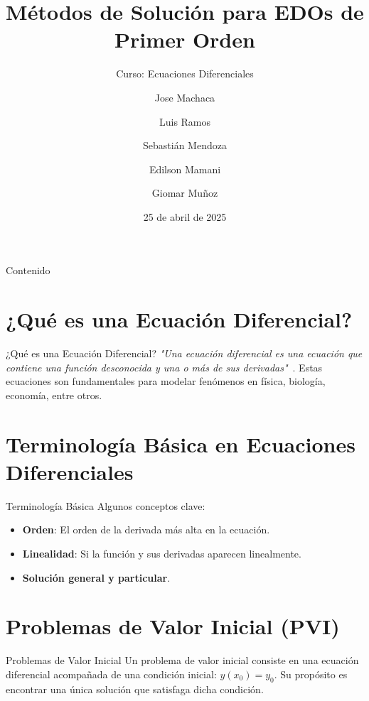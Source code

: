 \documentclass{beamer}
\title[Métodos EDO 1\textsuperscript{er} orden]{Métodos de Solución para EDOs de Primer Orden}
\subtitle{Curso: Ecuaciones Diferenciales}
\author{Jose Machaca \and Luis Ramos \and Sebastián Mendoza \and Edilson Mamani \and Giomar Muñoz}
\date{25 de abril de 2025}
\begin{document}
\begin{frame}
  \titlepage
\end{frame}

\begin{frame}{Contenido}
  \tableofcontents
\end{frame}

\section{¿Qué es una Ecuación Diferencial?}
\begin{frame}{¿Qué es una Ecuación Diferencial?}
\textit{"Una ecuación diferencial es una ecuación que contiene una función desconocida y una o más de sus derivadas"}~\cite{Zill}.
Estas ecuaciones son fundamentales para modelar fenómenos en física, biología, economía, entre otros.
\end{frame}

\section{Terminología Básica en Ecuaciones Diferenciales}
\begin{frame}{Terminología Básica}
Algunos conceptos clave:
\begin{itemize}
  \item \textbf{Orden}: El orden de la derivada más alta en la ecuación.
  \item \textbf{Linealidad}: Si la función y sus derivadas aparecen linealmente.
  \item \textbf{Solución general y particular}.
\end{itemize}
\end{frame}

\section{Problemas de Valor Inicial (PVI)}
\begin{frame}{Problemas de Valor Inicial}
Un problema de valor inicial consiste en una ecuación diferencial acompañada de una condición inicial: $y(x_0) = y_0$. Su propósito es encontrar una única solución que satisfaga dicha condición.
\end{frame}
\end{document}
